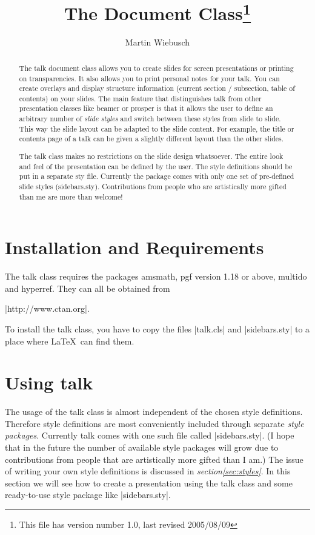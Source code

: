 \documentclass[12pt]{ltxdoc}
\title{The \pkg{talk} Document Class\thanks{This file has version number 1.0,
    last revised 2005/08/09}}
\author{Martin Wiebusch}
\newcommand{\mref}[2]{\textsl{#1\space\ref{#2}}}
\newcommand{\pkg}[1]{\textsf{#1}}
\renewenvironment{quote}{\list{}{\leftmargin\parindent}\item[]}{\endlist}
\begin{document}
\maketitle
\begin{abstract}
  The \pkg{talk} document class allows you to create slides for screen
  presentations or printing on transparencies. It also allows you to print
  personal notes for your talk. You can create overlays and display structure
  information (current section / subsection, table of contents) on your slides.
  The main feature that distinguishes \pkg{talk} from other presentation classes
  like \pkg{beamer} or \pkg{prosper} is that it allows the user to define an
  arbitrary number of \emph{slide styles} and switch between these styles from
  slide to slide. This way the slide layout can be adapted to the slide
  content. For example, the title or contents page of a talk can be given a
  slightly different layout than the other slides.

  The \pkg{talk} class makes no restrictions on the slide design whatsoever. The
  entire look and feel of the presentation can be defined by the user. The style
  definitions should be put in a separate sty file. Currently the package comes
  with only one set of pre-defined slide styles (sidebars.sty). Contributions
  from people who are artistically more gifted than me are more than welcome!
\end{abstract}
\newpage
\tableofcontents
%
%
%
\section{Installation and Requirements}
%
%
The \pkg{talk} class requires the packages \pkg{amsmath}, \pkg{pgf} version 1.18
or above, \pkg{multido} and \pkg{hyperref}. They can all be obtained from
\begin{quote}
  |http://www.ctan.org|.
\end{quote}

To install the \pkg{talk} class, you have to copy the files |talk.cls| and
|sidebars.sty| to a place where \LaTeX\ can find them.
%
%
%
\section{Using \pkg{talk}}
%
%
The usage of the \pkg{talk} class is almost independent of the chosen style
definitions. Therefore style definitions are most conveniently included through
separate \emph{style packages}. Currently \pkg{talk} comes with one such file
called |sidebars.sty|. (I hope that in the future the number of available style
packages will grow due to contributions from people that are artistically more
gifted than I am.) The issue of writing your own style definitions is discussed
in \mref{section}{sec:styles}. In this section we will see how to create a
presentation using the \pkg{talk} class and some ready-to-use style package like
|sidebars.sty|.
\end{document}
